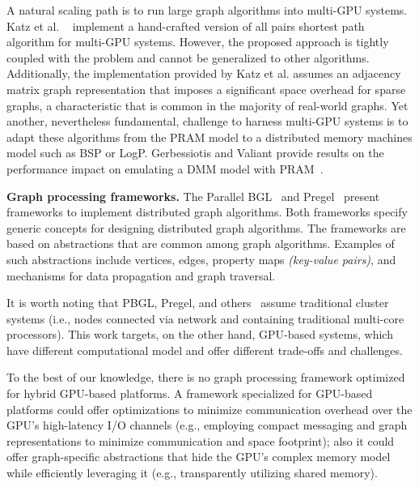 A natural scaling path is to run large graph algorithms into multi-GPU systems. Katz et al. ~\cite{Katz2008} implement a hand-crafted version of all pairs shortest path algorithm for multi-GPU systems. However, the proposed approach is tightly coupled with the problem and cannot be generalized to other algorithms. Additionally, the implementation provided by Katz et al. assumes an adjacency matrix graph representation that imposes a significant space overhead for sparse graphs, a characteristic that is common in the majority of real-world graphs. Yet another, nevertheless fundamental, challenge to harness multi-GPU systems is to adapt these algorithms from the PRAM model to a distributed memory machines model such as BSP or LogP. Gerbessiotis and Valiant provide results on the performance impact on emulating a DMM model with PRAM~\cite{Gerbessiotis92}. 

{\bf Graph processing frameworks.} The Parallel BGL~\cite{gregor2005parallel} and Pregel~\cite{Malewicz2009} present frameworks to implement distributed graph algorithms. Both frameworks specify generic concepts for designing distributed graph algorithms. The frameworks are based on abstractions that are common among graph algorithms. Examples of such abstractions include vertices, edges, property maps {\em (key-value pairs)}, and mechanisms for data propagation and graph traversal. 

It is worth noting that PBGL, Pregel, and others~\cite{Zhao2009} assume traditional cluster systems (i.e., nodes connected via network and containing traditional multi-core processors). This work targets, on the other hand, GPU-based systems, which have different computational model and offer different trade-offs and challenges. 

To the best of our knowledge, there is no graph processing framework optimized for hybrid GPU-based platforms. A framework specialized for GPU-based platforms could offer optimizations to minimize communication overhead over the GPU's high-latency I/O channels (e.g., employing compact messaging and graph representations to minimize communication and space footprint); also it could offer graph-specific abstractions that hide the GPU's complex memory model while efficiently leveraging it (e.g., transparently utilizing shared memory). 

